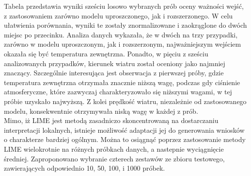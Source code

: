 \documentclass[a4paper,twoside,12pt]{book}
\begin{document}
Tabela przedstawia wyniki sześciu losowo wybranych prób oceny ważności wejść, z zastosowaniem zarówno modelu uproszczonego, jak i rozszerzonego. W celu ułatwienia porównania, wyniki te zostały znormalizowane i zaokrąglone do dwóch miejsc po przecinku. Analiza danych wykazała, że w dwóch na trzy przypadki, zarówno w modelu uproszczonym, jak i rozszerzonym, najważniejszym wejściem okazała się być temperatura zewnętrzna. Ponadto, w pięciu z sześciu analizowanych przypadków, kierunek wiatru został oceniony jako najmniej znaczący. Szczególnie interesująca jest obserwacja z pierwszej próby, gdzie temperatura zewnętrzna otrzymała znacznie niższą wagę, podczas gdy ciśnienie atmosferyczne, które zazwyczaj charakteryzowało się niższymi wagami, w tej próbie uzyskało najwyższą. Z kolei prędkość wiatru, niezależnie od zastosowanego modelu, konsekwentnie otrzymywała niską wagę w każdej z prób.\\

Mimo, iż LIME jest metodą zasadniczo skoncentrowaną na dostarczaniu interpretacji lokalnych, istnieje możliwość adaptacji jej do generowania wniosków o charakterze bardziej ogólnym. Można to osiągnąć poprzez zastosowanie metody LIME wielokrotnie na różnych próbkach danych, a nastepnie wyciągnięcie średniej. Zaproponowano wybranie czterech zestawów ze zbioru testowego, zawierających odpowiednio 10, 50, 100, i 1000 próbek.
\end{document}
